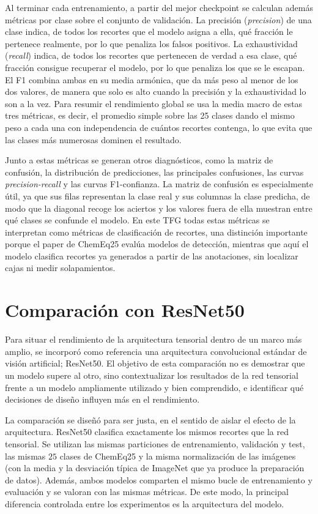 Al terminar cada entrenamiento, a partir del mejor checkpoint se calculan además métricas por clase sobre el conjunto de validación. La precisión (\textit{precision}) de una clase indica, de todos los recortes que el modelo asigna a ella, qué fracción le pertenece realmente, por lo que penaliza los falsos positivos. La exhaustividad (\textit{recall}) indica, de todos los recortes que pertenecen de verdad a esa clase, qué fracción consigue recuperar el modelo, por lo que penaliza los que se le escapan. El F1 combina ambas en su media armónica, que da más peso al menor de los dos valores, de manera que solo es alto cuando la precisión y la exhaustividad lo son a la vez. Para resumir el rendimiento global se usa la media macro de estas tres métricas, es decir, el promedio simple sobre las 25 clases dando el mismo peso a cada una con independencia de cuántos recortes contenga, lo que evita que las clases más numerosas dominen el resultado.

Junto a estas métricas se generan otros diagnósticos, como la matriz de confusión, la distribución de predicciones, las principales confusiones, las curvas \textit{precision-recall} y las curvas F1-confianza. La matriz de confusión es especialmente útil, ya que sus filas representan la clase real y sus columnas la clase predicha, de modo que la diagonal recoge los aciertos y los valores fuera de ella muestran entre qué clases se confunde el modelo. En este TFG todas estas métricas se interpretan como métricas de clasificación de recortes, una distinción importante porque el paper de ChemEq25 evalúa modelos de detección, mientras que aquí el modelo clasifica recortes ya generados a partir de las anotaciones, sin localizar cajas ni medir solapamientos.

\section{Comparación con ResNet50}\label{sec:resnet}

Para situar el rendimiento de la arquitectura tensorial dentro de un marco más amplio, se incorporó como referencia una arquitectura convolucional estándar de visión artificial; ResNet50. El objetivo de esta comparación no es demostrar que un modelo supere al otro, sino contextualizar los resultados de la red tensorial frente a un modelo ampliamente utilizado y bien comprendido, e identificar qué decisiones de diseño influyen más en el rendimiento.

La comparación se diseñó para ser justa, en el sentido de aislar el efecto de la arquitectura. ResNet50 clasifica exactamente los mismos recortes que la red tensorial. Se utilizan las mismas particiones de entrenamiento, validación y test, las mismas $25$ clases de ChemEq25 y la misma normalización de las imágenes (con la media y la desviación típica de ImageNet que ya produce la preparación de datos). Además, ambos modelos comparten el mismo bucle de entrenamiento y evaluación y se valoran con las mismas métricas. De este modo, la principal diferencia controlada entre los experimentos es la arquitectura del modelo.

